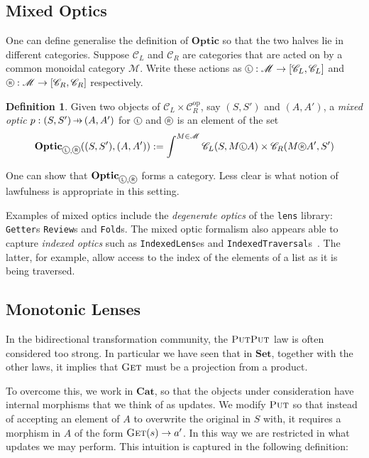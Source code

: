 \documentclass[11pt,letterpaper]{article}
\theoremstyle{plain}
\theoremstyle{definition}
\newtheorem{definition}[theorem]{Definition}
\newcommand{\C}{\mathscr{C}}
\newcommand{\M}{\mathscr{M}}
\newcommand{\lenslib}{\texttt{lens}}
\newcommand{\Set}{\mathbf{Set}}
\newcommand{\Cat}{\mathbf{Cat}}
\newcommand{\Optic}{\mathbf{Optic}}
\newcommand{\op}{\mathrm{op}}
\newcommand*\circled[1]{\tikz[baseline={([yshift=-0.65ex]current bounding box.center)}]{
   \node[shape=circle,draw,inner sep=1pt] (char) {#1};}}
\newcommand{\actL}{{\circled{\tiny$\mathsf{L}$}}}
\newcommand{\actR}{{\circled{\tiny$\mathsf{R}$}}}
\newcommand{\fget}{\textsc{Get}}
\newcommand{\fput}{\textsc{Put}}
\newcommand{\hto}{\ensuremath{\,\mathaccent\shortmid\rightarrow\,}}
\begin{document}
\subsection{Mixed Optics}

One can define generalise the definition of $\Optic$ so that the two halves lie in different categories. Suppose $\C_L$ and $\C_R$ are categories that are acted on by a common monoidal category $\M$. Write these actions as $\actL : \M \to [\C_L, \C_L]$ and $\actR : \M \to [\C_R, \C_R]$ respectively.

\begin{definition}
  Given two objects of $\C_L \times \C_R^\op$, say $(S, S')$ and $(A, A')$, a \emph{mixed optic} $p : (S, S') \hto (A, A')$ for $\actL$ and $\actR$ is an element of the set
  \begin{align*}
    \Optic_{\actL, \actR}((S, S'), (A, A')) := \int^{M \in \M} \C_L(S, M \actL A) \times \C_R(M \actR A', S')
  \end{align*}
\end{definition}
One can show that $\Optic_{\actL, \actR}$ forms a category. Less clear is what notion of lawfulness is appropriate in this setting.

Examples of mixed optics include the \emph{degenerate optics} of the \lenslib{} library: \texttt{Getter}s \texttt{Review}s and \texttt{Fold}s. The mixed optic formalism also appears able to capture \emph{indexed optics} such as \texttt{IndexedLens}es and \texttt{IndexedTraversal}s~\cite{ProfunctorOpticsPost}. The latter, for example, allow access to the index of the elements of a list as it is being traversed.

\subsection{Monotonic Lenses}
In the bidirectional transformation community, the $\fput\fput$ law is often considered too strong. In particular we have seen that in $\Set$, together with the other laws, it implies that $\fget$ must be a projection from a product.

To overcome this, we work in $\Cat$, so that the objects under consideration have internal morphisms that we think of as updates. We modify $\fput$ so that instead of accepting an element of $A$ to overwrite the original in $S$ with, it requires a morphism in $A$ of the form $\fget(s) \to a'$. In this way we are restricted in what updates we may perform. This intuition is captured in the following definition:
\end{document}
